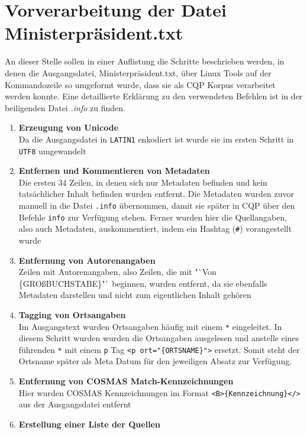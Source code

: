 \documentclass[%
	type=document,%
  	style=article,%
  	media=print,
  	pages=oneside,%
  	prefixLecturer=Dozenten:,
  	author=multiple,
]{unihildesheim} %
\begin{document}
\Titlepage
\cleardoublepage
\TOC
\cleardoublepage

%

\section{Vorverarbeitung der Datei Ministerpräsident.txt}
An dieser Stelle sollen in einer Auflistung die Schritte beschrieben werden,
in denen die Ausgangsdatei, Ministerpräsident.txt, über Linux Tools auf der
Kommandozeile so umgeformt wurde, dass sie als CQP Korpus verarbeitet werden
konnte. Eine detaillierte Erklärung zu den verwendeten Befehlen ist in der
beiligenden Datei \textit{.info} zu finden.
\begin{enumerate}
  \item \textbf{Erzeugung von Unicode}
  \\Da die Ausgangsdatei in \texttt{LATIN1} enkodiert ist
  wurde sie im ersten Schritt in \texttt{UTF8} umgewandelt
  \item \textbf{Entfernen und Kommentieren von Metadaten}
   \\Die ersten 34 Zeilen, in denen sich nur Metadaten befinden und kein
  tatsächlicher Inhalt befinden wurden entfernt. Die Metadaten wurden zuvor
  manuell in die Datei \texttt{.info} übernommen, damit sie später in CQP über
  den Befehle \texttt{info} zur Verfügung stehen. Ferner wurden hier die
  Quellangaben, also auch Metadaten, auskommentiert, indem ein Hashtag
  (\texttt{\#}) vorangestellt wurde
  \item \textbf{Entfernung von Autorenangaben}
  \\ Zeilen mit Autorenangaben, also Zeilen, die mit "`Von \{GROßBUCHSTABE\}"`
  beginnen, wurden entfernt, da sie ebenfalls Metadaten darstellen und nicht zum
  eigentlichen Inhalt gehören
  \item \textbf{Tagging von Ortsangaben}
  \\ Im Ausgangstext wurden Ortsangaben häufig mit einem \texttt{*} eingeleitet.
  In diesem Schritt wurden wurden die Ortsangaben ausgelesen und anstelle eines
  führenden \texttt{*} mit einem \texttt{p} Tag \texttt{<p ort="\{ORTSNAME\}">}
  ersetzt.
  Somit steht der Ortsname später als Meta Datum für den jeweiligen Absatz zur Verfügung.
  \item \textbf{Entfernung von COSMAS Match-Kennzeichnungen}
  \\ Hier wurden COSMAS Kennzeichnungen im Format
  \texttt{<B>\{Kennzeichnung\}</>} aus der Ausgangsdatei entfernt
  \item \textbf{Erstellung einer Liste der Quellen}

\end{enumerate}
\end{document}
